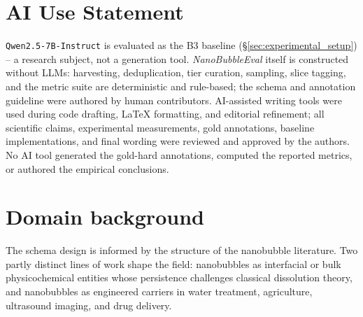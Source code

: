 \documentclass{article}
\begin{document}
\section*{AI Use Statement}
\label{sec:ai_use_statement}

\texttt{Qwen2.5-7B-Instruct} is evaluated as the B3 baseline (\S\ref{sec:experimental_setup}) -- a research subject, not a generation tool. \textit{NanoBubbleEval} itself is constructed without LLMs: harvesting, deduplication, tier curation, sampling, slice tagging, and the metric suite are deterministic and rule-based; the schema and annotation guideline were authored by human contributors. AI-assisted writing tools were used during code drafting, LaTeX formatting, and editorial refinement; all scientific claims, experimental measurements, gold annotations, baseline implementations, and final wording were reviewed and approved by the authors. No AI tool generated the gold-hard annotations, computed the reported metrics, or authored the empirical conclusions.





\clearpage
\appendix
\renewcommand\thesection{\Alph{section}}
\renewcommand\thesubsection{\thesection.\arabic{subsection}}

\label{sec:final-appendix}
\tableofcontents

\newpage

\section{Domain background}
\label{app:domain_background}

The schema design is informed by the structure of the nanobubble
literature. Two partly distinct lines of work shape the field:
nanobubbles as interfacial or bulk physicochemical entities whose
persistence challenges classical dissolution theory, and nanobubbles
as engineered carriers in water treatment, agriculture, ultrasound
imaging, and drug delivery.
\end{document}
